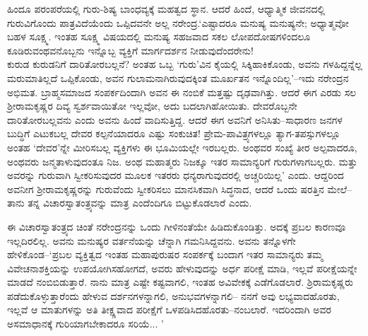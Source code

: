 ಹಿಂದೂ ಪರಂಪರೆಯಲ್ಲಿ ಗುರು-ಶಿಷ್ಯ ಬಾಂಧವ್ಯಕ್ಕೆ ಮಹತ್ವದ ಸ್ಥಾನ. ಆದರೆ ಹಿಂದೆ, ಆಧ್ಯಾತ್ಮಿಕ ಜೀವನದಲ್ಲಿ ಗುರುವಿಗೊಂದು ಪಾತ್ರವಿದೆಯೆಂದು ಒಪ್ಪಿದವನೇ ಅಲ್ಲ ನರೇಂದ್ರ.‘ಎಷ್ಟಾದರೂ ಮನುಷ್ಯ ಮನುಷ್ಯನೇ; ಅಧ್ಯಾತ್ಮವೋ ಬಹಳ ಸೂಕ್ಷ್ಮ. ಇಂತಹ ಸೂಕ್ಷ್ಮ ವಿಷಯದಲ್ಲಿ ಮನುಷ್ಯ ಸಹಜವಾದ ಸಕಲ ಲೋಪದೋಷಗಳಿಂದಲೂ ಕೂಡಿರುವಂಥವನೊಬ್ಬನು ಇನ್ನೊಬ್ಬ ವ್ಯಕ್ತಿಗೆ ಮಾರ್ಗದರ್ಶನ ನೀಡುವುದೆಂದರೇನು!\\ಕುರುಡ ಕುರುಡನಿಗೆ ದಾರಿತೋರಬಲ್ಲನೆ? ಅಂತಹ ಒಬ್ಬ ‘ಗುರು’ವಿನ ಕೈಯಲ್ಲಿ ಸಿಕ್ಕಿಹಾಕಿಕೊಂಡು, ಅವನು ಗಳಹಿದ್ದನ್ನೆಲ್ಲ ಮರುಮಾತಿಲ್ಲದೆ ಒಪ್ಪಿಕೊಂಡು, ಅವನ ಗುಲಾಮನಾಗಿರುವುದಕ್ಕಿಂತ ಮೂರ್ಖತನ ಇನ್ನೊಂದಿಲ್ಲ’–ಇದು ನರೇಂದ್ರನ ಅಭಿಮತ. ಬ್ರಾಹ್ಮಸಮಾಜದ ಸಂಪರ್ಕದಿಂದಾಗಿ ಅವನ ಈ ನಂಬಿಕೆ ಮತ್ತಷ್ಟು ದೃಢವಾಗಿತ್ತು. ಆದರೆ ಈಗ ಎರಡು ಸಲ ಶ್ರೀರಾಮಕೃಷ್ಣರ ದಿವ್ಯ ಸ್ವರ್ಶವಾಯಿತೋ ಇಲ್ಲವೋ, ಅದು ಬದಲಾಗಿಹೋಯಿತು. ದೇವರೊಬ್ಬನೇ ದಾರಿತೋರಬಲ್ಲವನು ಎಂದು ಅವನು ಹಿಂದೆ ವಾದಿಸುತ್ತಿದ್ದ. ಆದರೆ ಈಗ ಅವನಿಗೆ ಅನಿಸಿತು–ಸಾಧಾರಣ ಜನಗಳ ಬುದ್ಧಿಗೆ ಎಟುಕಬಲ್ಲ ದೇವರ ಕಲ್ಪನೆಯಾದರೂ ಎಷ್ಟು ಸಂಕುಚಿತ! ಪ್ರೇಮ-ಪಾವಿತ್ರ್ಯಗಳಲ್ಲೂ ತ್ಯಾಗ-ತಪಸ್ಸುಗಳಲ್ಲೂ ಅಂತಹ ‘ದೇವರ’ನ್ನೇ ಮೀರಿಸಬಲ್ಲ ವ್ಯಕ್ತಿಗಳು ಈ ಭೂಮಿಯಲ್ಲೇ ಇರಬಲ್ಲರು. ಅಂಥವರ ಸಂಖ್ಯೆ ತೀರ ಅಲ್ಪವಾದರೂ, ಅಂಥವರು ಜನ್ಮತಾಳುವುದಂತೂ ನಿಜ. ಅಂಥ ಮಹಾತ್ಮರು ನಿಜಕ್ಕೂ ಇತರ ಸಾಮಾನ್ಯರಿಗೆ ಗುರುಗಳಾಗಬಲ್ಲರು. ಮತ್ತು ಅವರನ್ನು ಗುರುವಾಗಿ ಸ್ವೀಕರಿಸುವುದರ ಮೂಲಕ ಇತರರು ಧನ್ಯರಾಗುವುದರಲ್ಲಿ ಅಚ್ಚರಿಯಿಲ್ಲ’ ಎಂದು. ಆದ್ದರಿಂದ ಅವನೀಗ ಶ್ರೀರಾಮಕೃಷ್ಣರನ್ನು ಗುರುವೆಂದು ಸ್ವೀಕರಿಸಲು ಮಾನಸಿಕವಾಗಿ ಸಿದ್ಧನಾದ, ಆದರೆ ಒಂದು ಷರತ್ತಿನ ಮೇಲೆ–ತಾನು ತನ್ನ ವಿಚಾರಸ್ವಾತಂತ್ರ್ಯವನ್ನು ಮಾತ್ರ ಎಂದೆಂದಿಗೂ ಬಿಟ್ಟುಕೊಡಲಾರೆ ಎಂದು.

ಈ ವಿಚಾರಸ್ವಾತಂತ್ರ್ಯದ ಚಿಂತೆ ನರೇಂದ್ರನನ್ನು ಒಂದು ಗೀಳಿನಂತೆಯೇ ಹಿಡಿದುಕೊಂಡಿತ್ತು. ಅದಕ್ಕೆ ಪ್ರಬಲ ಕಾರಣವೂ ಇಲ್ಲದಿರಲಿಲ್ಲ. ಅವನು ಮನುಷ್ಯರ ವರ್ತನೆಯನ್ನು ಚೆನ್ನಾಗಿ ಗಮನಿಸಿದ್ದವನು. ಅವನು ತನ್ನೊಳಗೇ ಹೇಳಿಕೊಂಡ–‘ಪ್ರಬಲ ವ್ಯಕ್ತಿತ್ವದ ಇಂತಹ ಮಹಾಪುರುಷರ ಸಂಪರ್ಕಕ್ಕೆ ಬಂದಾಗ ಇತರ ಸಾಮಾನ್ಯರು ತಮ್ಮ ವಿವೇಚನಾಶಕ್ತಿಯನ್ನು ಉಪಯೋಗಿಸಹೋಗದೆ, ಅವರು ಹೇಳುವುದನ್ನು ಅರ್ಧ ಪರೀಕ್ಷೆ ಮಾಡಿ, ಇಲ್ಲವೆ ಪರೀಕ್ಷೆಯನ್ನೇ ಮಾಡದೆ ನಂಬಿಬಿಡುತ್ತಾರೆ. ನಾನು ಮಾತ್ರ ಎಷ್ಟೇ ಕಷ್ಟವಾಗಲಿ, ಇಂತಹ ಅವಿವೇಕಕ್ಕೆ ಎಡೆಗೊಡಲಾರೆ. ಶ್ರಿರಾಮಕೃಷ್ಣರು ಪಡೆದುಕೊಳ್ಳುತ್ತಾರೆಂದು ಹೇಳುವ ದರ್ಶನಗಳನ್ನಾಗಲಿ, ಅನುಭವಗಳನ್ನಾಗಲಿ– ನನಗೆ ಅವು ಲಭ್ಯವಾದಹೊರತು, ಇಲ್ಲವೆ ಆ ಮಾತುಗಳನ್ನು ಅತಿ ತೀಕ್ಷ್ಣವಾದ ಪರೀಕ್ಷೆಗೆ ಒಳಪಡಿಸಿದಹೊರತು–ನಂಬಲಾರೆ. ಇದರಿಂದಾಗಿ ಅವರ ಅಸಮಾಧಾನಕ್ಕೆ ಗುರಿಯಾಗಬೇಕಾದರೂ ಸರಿಯೆ... ’

